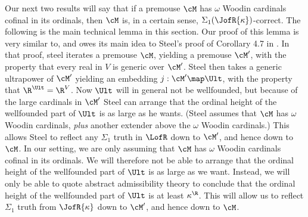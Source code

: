 Our next two results will say that if
a premouse $\cM$ has $\omega$ Woodin cardinals cofinal in its ordinals,
then $\cM$ is, in
a certain sense, $\Sigma_1(\JofR{\kappa})$-correct.
The  following is the main technical lemma in this section. Our
proof of this lemma is very similar to, and owes its main idea to
Steel's proof of Corollary 4.7 in \cite{Many_Woodins}. In that proof,
steel iterates a premouse $\cM$, yielding a premouse $\cM^{\prime}$,
with the property that every real in $V$ is generic over $\cM^{\prime}$.
Steel then takes a generic ultrapower of $\cM^{\prime}$ yielding an
embedding $j:\cM^{\prime}\map\Ult$, with the property that
$\R^{\Ult}=\R^{V}$.
Now $\Ult$ will in general not
be wellfounded, but because of the large cardinals in $\cM^{\prime}$
Steel can arrange that the ordinal height of the wellfounded part
of $\Ult$ is as large as he wants.
(Steel assumes that $\cM$ has $\omega$ Woodin cardinals, \emph{plus}
another extender above the $\omega$ Woodin cardinals.) This allows
Steel to reflect any $\Sigma_1$ truth in $\LofR$ down to $\cM^{\prime}$,
and hence down to $\cM$. In our setting, we are only assuming that
$\cM$ has $\omega$ Woodin cardinals cofinal in its ordinals. We will
therefore not be able to arrange that the ordinal height of
the wellfounded part of $\Ult$ is as large as we want. Instead, we
will only be able to quote abstract admissibility theory to conclude
that the ordinal height of the wellfounded part of $\Ult$ is at
least $\kappa^{\R}$. This will allow us to reflect $\Sigma_1$ truth
from $\JofR{\kappa}$ down to $\cM^{\prime}$, and hence down to $\cM$.

